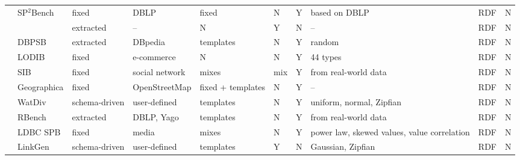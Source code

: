 \begin{sidewaystable}
{\begin{tabular}{| c | p{2.2cm} | p{2cm} |  p{2.2cm} | l |  l | l | p{3cm} | p{1.4cm} | l | }
 & SP$^2$Bench & fixed & DBLP  & fixed & N & Y & based on DBLP  & RDF & N   \\
\cline{2-10}
 & \cite{Duan:2011:AOC:1989323.1989340} & extracted & -- & N & Y &N & -- &  RDF & N    \\
\cline{2-10}
 & DBPSB & extracted & DBpedia &  templates & N & Y & random &  RDF & N   \\
\cline{2-10}
 & LODIB & fixed & e-commerce &  N & N & Y & 44 types &  RDF & N   \\
\cline{2-10}
 & SIB & fixed & social network &  mixes & mix & Y & from real-world data &  RDF & N   \\
\cline{2-10}
 & Geographica & fixed & OpenStreetMap  & fixed + templates  & N & Y & -- &  RDF & N   \\
\cline{2-10}
 & WatDiv & schema-driven & user-defined  & templates & N & Y & uniform, normal, Zipfian &  RDF & N   \\
\cline{2-10}
 & RBench & extracted & DBLP, Yago  & templates & N & Y & from real-world data &  RDF & N  \\
\cline{2-10}
 & LDBC SPB & fixed & media  & mixes & N & Y & power law, skewed values, value correlation &  RDF & N  \\
\cline{2-10}
 & LinkGen & schema-driven & user-defined & templates & Y  & N & Gaussian, Zipfian & RDF & N\\
\hline
\end{tabular} }
\label{tab:comparisonCharacteristicsA}
\end{sidewaystable}

